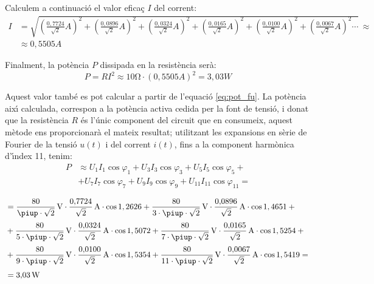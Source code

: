 \begin{exemple}
Calculem a continuaci\'{o} el valor efica\c{c} $I$ del corrent:
\[\begin{split}
    I &= \sqrt{\left(\tfrac{0{,}7724}{\sqrt{2}}\unit{A}\right)^2 +
        \left(\tfrac{0{,}0896}{\sqrt{2}}\unit{A}\right)^2 +
        \left(\tfrac{0{,}0324}{\sqrt{2}}\unit{A}\right)^2 +
        \left(\tfrac{0{,}0165}{\sqrt{2}}\unit{A}\right)^2 +
        \left(\tfrac{0{,}0100}{\sqrt{2}}\unit{A}\right)^2 +
        \left(\tfrac{0{,}0067}{\sqrt{2}}\unit{A}\right)^2 \cdots}
        \,\approx \\[1ex]
        &\approx 0{,}5505\unit{A}
\end{split}\]

Finalment, la pot\`{e}ncia $P$ dissipada en la resist\`{e}ncia ser\`{a}:
\[
    P = R I^2 \approx 10\unit{\ohm} \cdot (0{,}5505\unit{A})^2 =
    3{,}03\unit{W}
\]

Aquest valor tamb\'{e} es pot calcular a partir de l'equaci\'{o}
\eqref{eq:pot_fu}. La pot\`{e}ncia aix\'{\i} calculada, correspon a la
pot\`{e}ncia activa cedida per la font de tensi\'{o}, i donat que la
resist\`{e}ncia $R$ \'{e}s l'\'{u}nic component del circuit que en consumeix,
aquest m\`{e}tode ens proporcionar\`{a} el mateix resultat; utilitzant les
expansions en s\`{e}rie de Fourier de la tensi\'{o} $u(t)$ i del corrent
$i(t)$, fins a la component harm\`{o}nica d'\'{\i}ndex 11, tenim:
\[\begin{split}
    P &\approx U_1 I_1 \cos\varphi_1 +  U_3 I_3 \cos\varphi_3 +
     U_5 I_5 \cos\varphi_5 +{}\\[0.7ex]
     &+  U_7 I_7 \cos\varphi_7 +
     U_9 I_9 \cos\varphi_9 + U_{11} I_{11} \cos\varphi_{11} ={}
\end{split}\]


\[\begin{split}
    &= \frac{80}{\piup\cdot\sqrt{2}}\unit{V} \cdot
    \frac{0{,}7724}{\sqrt{2}}\unit{A} \cdot \cos 1{,2626} +
    \frac{80}{3\cdot\piup\cdot\sqrt{2}}\unit{V} \cdot
    \frac{0{,}0896}{\sqrt{2}}\unit{A} \cdot \cos 1{,4651} + {} \\[0.7ex]
    &+ \frac{80}{5\cdot\piup\cdot\sqrt{2}}\unit{V} \cdot
    \frac{0{,}0324}{\sqrt{2}}\unit{A} \cdot \cos 1{,5072} +
    \frac{80}{7\cdot\piup\cdot\sqrt{2}}\unit{V} \cdot
    \frac{0{,}0165}{\sqrt{2}}\unit{A} \cdot \cos 1{,5254} + {}\\[0.7ex]
    &+ \frac{80}{9\cdot\piup\cdot\sqrt{2}}\unit{V} \cdot
    \frac{0{,}0100}{\sqrt{2}}\unit{A} \cdot \cos 1{,5354} +
    \frac{80}{11\cdot\piup\cdot\sqrt{2}}\unit{V} \cdot
    \frac{0{,}0067}{\sqrt{2}}\unit{A} \cdot \cos 1{,5419}= {}\\[0.7ex]
    &=3{,}03\unit{W}
\end{split}\]


\end{exemple}
